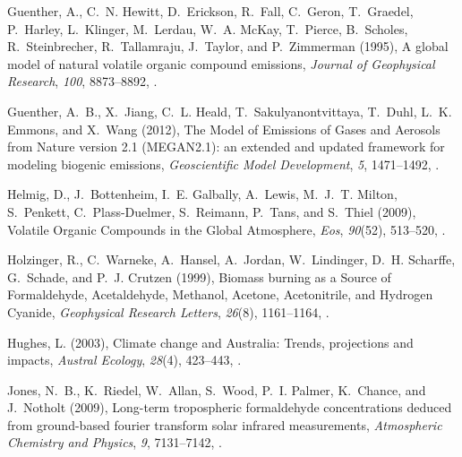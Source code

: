 \documentclass[draft,linenumbers]{AGUJournal}
\begin{document}
\begin{thebibliography}{51}
Guenther, A., C.~N. Hewitt, D.~Erickson, R.~Fall, C.~Geron, T.~Graedel,
  P.~Harley, L.~Klinger, M.~Lerdau, W.~A. McKay, T.~Pierce, B.~Scholes,
  R.~Steinbrecher, R.~Tallamraju, J.~Taylor, and P.~Zimmerman (1995), {A global
  model of natural volatile organic compound emissions}, \textit{Journal of
  Geophysical Research}, \textit{100}, 8873--8892, .

Guenther, A.~B., X.~Jiang, C.~L. Heald, T.~Sakulyanontvittaya, T.~Duhl, L.~K.
  Emmons, and X.~Wang (2012), {The Model of Emissions of Gases and Aerosols
  from Nature version 2.1 (MEGAN2.1): an extended and updated framework for
  modeling biogenic emissions}, \textit{Geoscientific Model Development},
  \textit{5}, 1471--1492, .

Helmig, D., J.~Bottenheim, I.~E. Galbally, A.~Lewis, M.~J.~T. Milton,
  S.~Penkett, C.~Plass-Duelmer, S.~Reimann, P.~Tans, and S.~Thiel (2009),
  {Volatile Organic Compounds in the Global Atmosphere}, \textit{Eos},
  \textit{90}(52), 513--520, .

Holzinger, R., C.~Warneke, A.~Hansel, A.~Jordan, W.~Lindinger, D.~H. Scharffe,
  G.~Schade, and P.~J. Crutzen (1999), {Biomass burning as a Source of
  Formaldehyde, Acetaldehyde, Methanol, Acetone, Acetonitrile, and Hydrogen
  Cyanide}, \textit{Geophysical Research Letters}, \textit{26}(8), 1161--1164,
  .

Hughes, L. (2003), {Climate change and Australia: Trends, projections and
  impacts}, \textit{Austral Ecology}, \textit{28}(4), 423--443,
  .

Jones, N.~B., K.~Riedel, W.~Allan, S.~Wood, P.~I. Palmer, K.~Chance, and
  J.~Notholt (2009), {Long-term tropospheric formaldehyde concentrations
  deduced from ground-based fourier transform solar infrared measurements},
  \textit{Atmospheric Chemistry and Physics}, \textit{9}, 7131--7142,
  .


\end{thebibliography}
\end{document}
